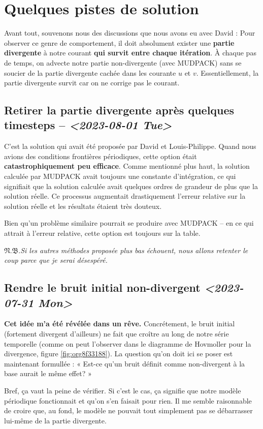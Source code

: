 \documentclass[10pt]{article}
\numberwithin{equation}{section}
\newcommand{\pt}{\hspace{1pt}} %
\newcommand{\nb}{\underline{{\footnotesize\EightStarConvex}\pt $\mathfrak{N.B.}$\vphantom{p}}\hspace{3pt}}
\begin{document}
\section{Quelques pistes de solution}
\label{sec:org0cc8ea9}
Avant tout, souvenons nous des discussions que nous avons eu avec David : 
Pour observer ce genre de comportement, il doit absolument exister une \textbf{partie divergente} à notre courant \textbf{qui survit entre chaque itération}.
À chaque pas de temps, on advecte notre partie non-divergente (avec MUDPACK) sans se soucier de la partie divergente cachée dans les courante \(u\) et \(v\).
Essentiellement, la partie divergente survit car on ne corrige pas le courant.
\subsection{Retirer la partie divergente après quelques timesteps -- \textit{<2023-08-01 Tue>}}
\label{sec:org24f76cb}
C'est la solution qui avait été proposée par David et Louis-Philippe.
Quand nous avions des conditions frontières périodiques, cette option était \textbf{catastrophiquement peu efficace}.
Comme mentionné plus haut, la solution calculée par MUDPACK avait toujours une constante d'intégration, ce qui signifiait que la solution calculée avait quelques ordres de grandeur de plus que la solution réelle.
Ce processus augmentait drastiquement l'erreur relative sur la solution réelle et les résultats étaient très douteux.\bigskip

Bien qu'un problème similaire pourrait se produire avec MUDPACK -- en ce qui attrait à l'erreur relative, cette option est toujours sur la table.\bigskip

\nb \emph{Si les autres méthodes proposée plus bas échouent, nous allons retenter le coup parce que je serai désespéré.}
\subsection{Rendre le bruit initial non-divergent \textit{<2023-07-31 Mon>}}
\label{sec:org24c5851}
\textbf{Cet idée m'a été révélée dans un rêve.}
Concrétement, le bruit initial (fortement divergent d'ailleurs) ne fait que croître au long de notre série temporelle (comme on peut l'observer dans le diagramme de Hovmoller pour la divergence, figure \ref{fig:org8f33188}).
La question qu'on doit ici se poser est maintenant formullée : « Est-ce qu'un bruit définit comme non-divergent à la base aurait le même effet? »\bigskip

Bref, ça vaut la peine de vérifier.
Si c'est le cas, ça signifie que notre modèle périodique fonctionnait et qu'on s'en faisait pour rien.
Il me semble raisonnable de croire que, au fond, le modèle ne pouvait tout simplement pas se débarrasser lui-même de la partie divergente.\bigskip
\end{document}
